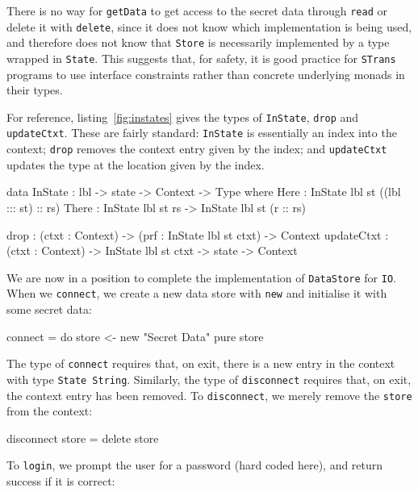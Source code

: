There is no way for \texttt{getData} to get access to the secret data through
\texttt{read} or delete it with \texttt{delete}, since it does not know
which implementation is being used, and therefore does not know that
\texttt{Store} is necessarily implemented by a type wrapped in
\texttt{State}. This suggests that, for safety,
it is good practice for \texttt{STrans} programs to use interface constraints
rather than concrete underlying monads in their types.

For reference, listing~\ref{fig:instates} gives the types of
\texttt{InState}, \texttt{drop} and \texttt{updateCtxt}. These are fairly
standard: \texttt{InState} is essentially an index into the context;
\texttt{drop} removes the context entry given by the index; and
\texttt{updateCtxt} updates the type at the location given by the index.

\small
\begin{code}[float=h, frame=single,caption={The \texttt{InState} predicate,
which describes the type of a context entry, and functions for manipulating
the context},label=fig:instates]
data InState : lbl -> state -> Context -> Type where
     Here : InState lbl st ((lbl ::: st) :: rs)
     There : InState lbl st rs -> InState lbl st (r :: rs)

drop : (ctxt : Context) -> (prf : InState lbl st ctxt) -> Context
updateCtxt : (ctxt : Context) -> InState lbl st ctxt -> state -> Context
\end{code}
\normalsize

We are now in a position to complete the implementation of
\texttt{DataStore} for \texttt{IO}. When we \texttt{connect}, we create
a new data store with \texttt{new} and initialise it with some secret data:

\small
\begin{code}
connect = do store <- new "Secret Data"
             pure store
\end{code}
\normalsize

\noindent
The type of \texttt{connect} requires that, on exit, there is a new
entry in the context with type \texttt{State String}. Similarly, the
type of \texttt{disconnect} requires that, on exit, the context entry
has been removed.
To \texttt{disconnect}, we merely remove the \texttt{store} from the
context:

\small
\begin{code}
disconnect store = delete store
\end{code}
\normalsize

\noindent
To \texttt{login}, we prompt the user for a password (hard coded here), and
return success if it is correct:

